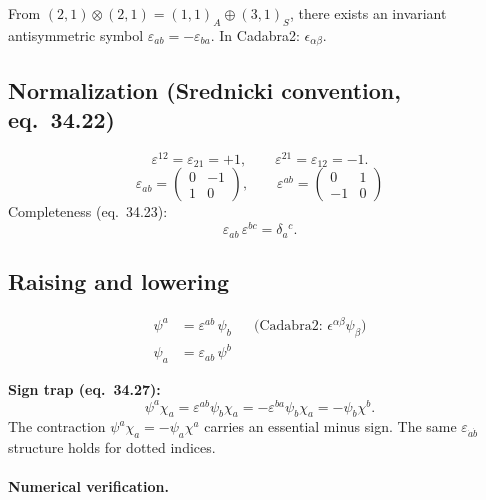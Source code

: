 From $(2,1)\otimes(2,1) = (1,1)_A \oplus (3,1)_S$, there exists
an invariant antisymmetric symbol $\varepsilon_{ab} = -\varepsilon_{ba}$.
In Cadabra2: $\epsilon_{\alpha \beta}$.

\subsection{Normalization (Srednicki convention, eq.~34.22)}
\begin{equation}
  \varepsilon^{12} = \varepsilon_{21} = +1,\qquad
  \varepsilon^{21} = \varepsilon_{12} = -1.
\end{equation}
\[
  \varepsilon_{ab} = \begin{pmatrix}0 & -1 \\ 1 & 0\end{pmatrix},\qquad
  \varepsilon^{ab} = \begin{pmatrix}0 & 1 \\ -1 & 0\end{pmatrix}
\]
Completeness (eq.~34.23):
\begin{equation}
  \varepsilon_{ab}\,\varepsilon^{bc} = \delta_a{}^c.
\end{equation}

\subsection{Raising and lowering}
\begin{align}
  \psi^a &= \varepsilon^{ab}\,\psi_b
  &&\text{(Cadabra2: } \epsilon^{\alpha \beta} \psi_{\beta}\text{)} \\
  \psi_a &= \varepsilon_{ab}\,\psi^b
\end{align}

\noindent\textbf{Sign trap (eq.~34.27):}
\begin{equation}
  \psi^a\chi_a = \varepsilon^{ab}\psi_b\chi_a
  = -\varepsilon^{ba}\psi_b\chi_a = -\psi_b\chi^b.
\end{equation}
The contraction $\psi^a\chi_a = -\psi_a\chi^a$ carries an essential minus sign.
The same $\varepsilon_{\dot{a}\dot{b}}$ structure holds for dotted indices.

\paragraph{Numerical verification.}

